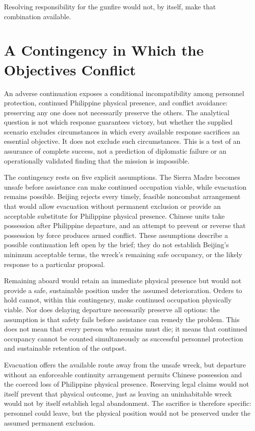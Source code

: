 \documentclass[11pt]{article}
\begin{document}
Resolving responsibility for the gunfire would not, by itself, make that combination available.

\section{A Contingency in Which the Objectives Conflict}
An adverse continuation exposes a conditional incompatibility among personnel protection, continued Philippine physical presence, and conflict avoidance: preserving any one does not necessarily preserve the others. The analytical question is not which response guarantees victory, but whether the supplied scenario excludes circumstances in which every available response sacrifices an essential objective. It does not exclude such circumstances. This is a test of an assurance of complete success, not a prediction of diplomatic failure or an operationally validated finding that the mission is impossible.

The contingency rests on five explicit assumptions. The Sierra Madre becomes unsafe before assistance can make continued occupation viable, while evacuation remains possible. Beijing rejects every timely, feasible noncombat arrangement that would allow evacuation without permanent exclusion or provide an acceptable substitute for Philippine physical presence. Chinese units take possession after Philippine departure, and an attempt to prevent or reverse that possession by force produces armed conflict. These assumptions describe a possible continuation left open by the brief; they do not establish Beijing’s minimum acceptable terms, the wreck’s remaining safe occupancy, or the likely response to a particular proposal.

Remaining aboard would retain an immediate physical presence but would not provide a safe, sustainable position under the assumed deterioration. Orders to hold cannot, within this contingency, make continued occupation physically viable. Nor does delaying departure necessarily preserve all options: the assumption is that safety fails before assistance can remedy the problem. This does not mean that every person who remains must die; it means that continued occupancy cannot be counted simultaneously as successful personnel protection and sustainable retention of the outpost.

Evacuation offers the available route away from the unsafe wreck, but departure without an enforceable continuity arrangement permits Chinese possession and the coerced loss of Philippine physical presence. Reserving legal claims would not itself prevent that physical outcome, just as leaving an uninhabitable wreck would not by itself establish legal abandonment. The sacrifice is therefore specific: personnel could leave, but the physical position would not be preserved under the assumed permanent exclusion.
\end{document}
